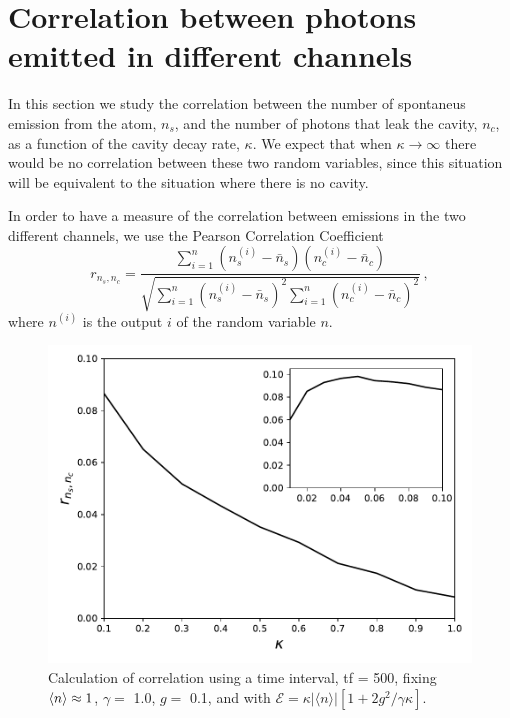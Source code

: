 \documentclass[%
 reprint,
 amsmath,amssymb,
 aps, 
]{revtex4-1}
\begin{document}
\section{Correlation between photons emitted in different channels}\label{sc:correlation}
In this section we study the correlation between the number of
spontaneus emission from the atom, $n_s$, and the number of photons
that leak the cavity, $n_c$, as a function of the cavity decay rate,
$\kappa$. We expect that when $\kappa\rightarrow\infty$ there would be
no correlation between these two random variables, since this
situation will be equivalent to the situation where there is no
cavity.

In order to have a measure of the correlation between emissions in the
two different channels, we use the Pearson Correlation Coefficient
\cite{benesty2009pearson}
\begin{equation} 
r_{n_s,n_c} = \frac{\sum\limits_{i=1}^n(n_s^{(i)} -
  \bar{n}_s)(n_c^{(i)} - \bar{n}_c)}{\sqrt{\sum\limits_{i=1}^n(n_s^{(i)}
    - \bar{n}_s)^2\sum\limits_{i=1}^n(n_c^{(i)} - \bar{n}_c)^2}}\, ,  \label{correlationc}
\end{equation}
where $n^{(i)}$ is the output $i$ of the random variable $n$.

\begin{center}
\begin{figure}[t!]
\begin{center}
\includegraphics[scale = 0.5]{million1.pdf}
\caption{\small{Calculation of correlation using a time interval, tf = 500, fixing $\expval{n} \approx 1$, $\gamma =$ 1.0, $g = $ 0.1, and with  $\mathcal{E} =  \kappa |\langle n \rangle|[1 + 2g^2/\gamma \kappa]$.}} \label{corrxy}
\end{center}  
\end{figure}
\end{center}
\end{document}
